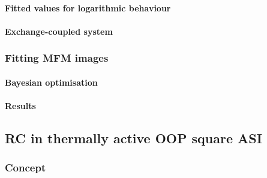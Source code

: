 \paragraph{Fitted values for logarithmic behaviour}
\paragraph{Exchange-coupled system} %
\subsubsection{Fitting MFM images}\label{sec:3:OOP:MFM}
\paragraph{Bayesian optimisation}
\paragraph{Results} %

\subsection{RC in thermally active OOP square ASI}
\subsubsection{Concept} %
